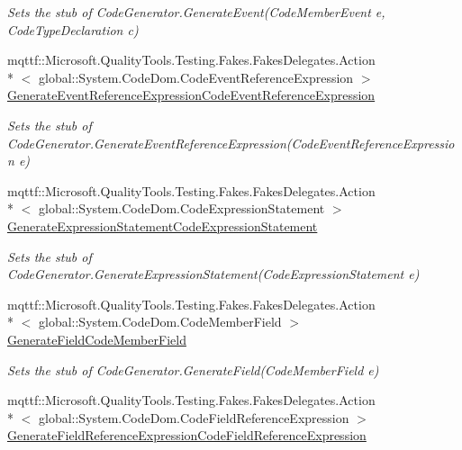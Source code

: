 \begin{DoxyCompactItemize}
\begin{DoxyCompactList}\small\item\em Sets the stub of Code\-Generator.\-Generate\-Event(\-Code\-Member\-Event e, Code\-Type\-Declaration c)\end{DoxyCompactList}\item 
mqttf\-::\-Microsoft.\-Quality\-Tools.\-Testing.\-Fakes.\-Fakes\-Delegates.\-Action\\*
$<$ global\-::\-System.\-Code\-Dom.\-Code\-Event\-Reference\-Expression $>$ \hyperlink{class_system_1_1_code_dom_1_1_compiler_1_1_fakes_1_1_stub_code_generator_a498fa79f343b3d3cddf032aed1e399f7}{Generate\-Event\-Reference\-Expression\-Code\-Event\-Reference\-Expression}
\begin{DoxyCompactList}\small\item\em Sets the stub of Code\-Generator.\-Generate\-Event\-Reference\-Expression(\-Code\-Event\-Reference\-Expression e)\end{DoxyCompactList}\item 
mqttf\-::\-Microsoft.\-Quality\-Tools.\-Testing.\-Fakes.\-Fakes\-Delegates.\-Action\\*
$<$ global\-::\-System.\-Code\-Dom.\-Code\-Expression\-Statement $>$ \hyperlink{class_system_1_1_code_dom_1_1_compiler_1_1_fakes_1_1_stub_code_generator_a7d8cb34c5c19ce32634862a9ee2238dc}{Generate\-Expression\-Statement\-Code\-Expression\-Statement}
\begin{DoxyCompactList}\small\item\em Sets the stub of Code\-Generator.\-Generate\-Expression\-Statement(\-Code\-Expression\-Statement e)\end{DoxyCompactList}\item 
mqttf\-::\-Microsoft.\-Quality\-Tools.\-Testing.\-Fakes.\-Fakes\-Delegates.\-Action\\*
$<$ global\-::\-System.\-Code\-Dom.\-Code\-Member\-Field $>$ \hyperlink{class_system_1_1_code_dom_1_1_compiler_1_1_fakes_1_1_stub_code_generator_a78a3ac374aa10b11df439f89769caa2c}{Generate\-Field\-Code\-Member\-Field}
\begin{DoxyCompactList}\small\item\em Sets the stub of Code\-Generator.\-Generate\-Field(\-Code\-Member\-Field e)\end{DoxyCompactList}\item 
mqttf\-::\-Microsoft.\-Quality\-Tools.\-Testing.\-Fakes.\-Fakes\-Delegates.\-Action\\*
$<$ global\-::\-System.\-Code\-Dom.\-Code\-Field\-Reference\-Expression $>$ \hyperlink{class_system_1_1_code_dom_1_1_compiler_1_1_fakes_1_1_stub_code_generator_afb163cd761d4bb003651c63eb133c14e}{Generate\-Field\-Reference\-Expression\-Code\-Field\-Reference\-Expression}

\end{DoxyCompactItemize}
